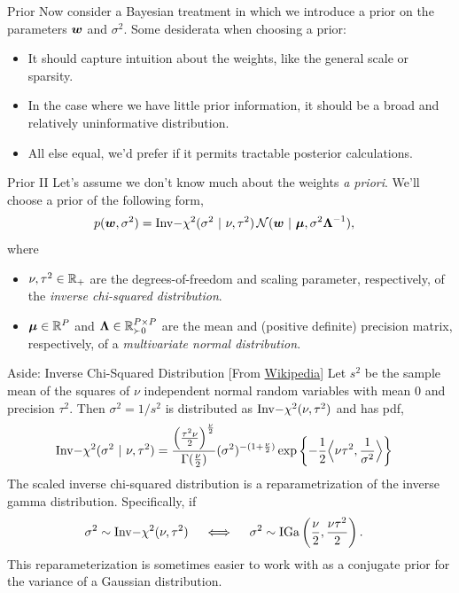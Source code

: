 \documentclass[aspectratio=169]{beamer}
\begin{document}
\begin{frame}{Prior}
Now consider a Bayesian treatment in which we introduce a prior on the parameters $\boldsymbol{w}$ and $\sigma^2$. Some desiderata when choosing a prior: 
\begin{itemize}
    \item It should capture intuition about the weights, like the general scale or sparsity.
    \item In the case where we have little prior information, it should be a broad and relatively uninformative distribution.
    \item All else equal, we'd prefer if it permits tractable posterior calculations.
\end{itemize}
\end{frame}

\begin{frame}{Prior II}
Let's assume we don't know much about the weights \emph{a priori}. We'll choose a prior of the following form,
\begin{align}
    p(\boldsymbol{w}, \sigma^2) &= \mathrm{Inv-}\chi^2(\sigma^2 ~\vert~ \nu, \tau^2) \, \mathcal{N}(\boldsymbol{w} ~\vert~ \boldsymbol{\mu}, \sigma^2 \boldsymbol{\Lambda}^{-1}),
\end{align}
where 
\begin{itemize}
    \item $\nu, \tau^2 \in \mathbb{R}_+$ are the degrees-of-freedom and scaling parameter, respectively, of the \textit{inverse chi-squared distribution}.
    \item $\boldsymbol{\mu} \in \mathbb{R}^P$ and $\boldsymbol{\Lambda} \in \mathbb{R}_{\succ 0}^{P \times P}$ are the mean and (positive definite) precision matrix, respectively, of a \emph{multivariate normal distribution}.
\end{itemize}

\end{frame}

\begin{frame}{Aside: Inverse Chi-Squared Distribution} 
[From \href{https://en.wikipedia.org/wiki/Scaled_inverse_chi-squared_distribution}{Wikipedia}] Let $s^2$ be the sample mean of the squares of $\nu$ independent normal random variables with mean 0 and precision $\tau^2$. Then $\sigma^2 = 1/s^2$ is distributed as $\mathrm{Inv-}\chi^2(\nu, \tau^2)$ and has pdf,
\begin{align}
    \mathrm{Inv-}\chi^2(\sigma^2 ~\vert~ \nu, \tau^2) &=
    \frac{\left(\frac{\tau^2 \nu}{2} \right)^{\frac{\nu}{2}}}{\Gamma(\frac{\nu}{2})} (\sigma^2)^{-(1+\frac{\nu}{2})} \exp \left\{-\frac{1}{2} \Big \langle \nu \tau^2, \frac{1}{\sigma^2} \Big \rangle \right \}
\end{align}
The scaled inverse chi-squared distribution is a reparametrization of the inverse gamma distribution. Specifically, if
\begin{align}
    \sigma^2 &\sim \mathrm{Inv-}\chi^2(\nu, \tau^2) \quad \iff \quad \sigma^2 \sim \mathrm{IGa}\left( \frac{\nu}{2}, \frac{\nu \tau^2}{2} \right).
\end{align}
This reparameterization is sometimes easier to work with as a conjugate prior for the variance of a Gaussian distribution.
\end{frame}
\end{document}
